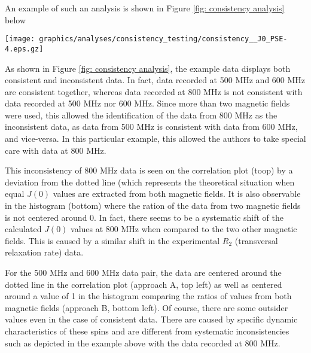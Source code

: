 An example of such an analysis is shown in Figure \ref{fig: consistency analysis} below

\begin{figure*}[h]
\label{fig: consistency analysis}
\texttt{[image: graphics/analyses/consistency\_testing/consistency\_\_J0\_PSE-4.eps.gz]}
\caption[Example of consistency testing visual analysis]{Example of consistency testing visual analysis. Relaxation data from three different magnetic fields are compared. For each pair of magnetic field, a correlation plot of the calculated $J(0)$ values (approach A, top) as well as an histogram of the ration of calculated $J(0)$ values (approach B, bottom) are shown. Data from \citep{MorinGagne09b} is used for the purpose of this example.}
\end{figure*}

As shown in Figure \ref{fig: consistency analysis}, the example data displays both consistent and inconsistent data. In fact, data recorded at 500 MHz and 600 MHz are consistent together, whereas data recorded at 800 MHz is not consistent with data recorded at 500 MHz nor 600 MHz.  Since more than two magnetic fields were used, this allowed the identification of the data from 800 MHz  as the inconsistent data, as data from 500 MHz is consistent with data from 600 MHz, and vice-versa.  In this particular example, this allowed the authors to take special care with data at 800 MHz.

This inconsistency of 800 MHz data is seen on the correlation plot (toop) by a deviation from the dotted line (which represents the theoretical situation when equal $J(0)$ values are extracted from both magnetic fields. It is also observable in the histogram (bottom) where the ration of the data from two magnetic fields is not centered around 0. In fact, there seems to be a systematic shift of the calculated $J(0)$ values at 800 MHz when compared to the two other magnetic fields. This is caused by a similar shift in the experimental $R_2$ (transversal relaxation rate) data.

For the 500 MHz and 600 MHz data pair, the data are centered around the dotted line in the correlation plot (approach A, top left) as well as centered around a value of 1 in the histogram comparing the ratios of values from both magnetic fields (approach B, bottom left). Of course, there are some outsider values even in the case of consistent data. There are caused by specific dynamic characteristics of these spins and are different from systematic inconsistencies such as depicted in the example above with the data recorded at 800 MHz.

